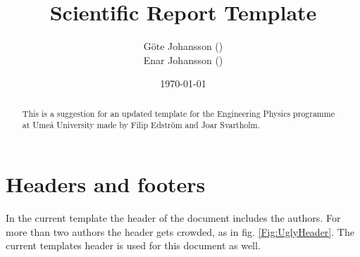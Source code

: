 
\usepackage{lipsum}
  \title{Scientific Report Template}
  \author{
    Göte Johansson () \\
    Enar Johansson ()
    }
  \date{\today}






\begin{titlepage}

  \maketitle
  \thispagestyle{FirstPageStyle}

  \begin{abstract}
   \noindent
   This is a suggestion for an updated template for the Engineering Physics programme at Umeå University made by Filip Edström and Joar Svartholm.
  \end{abstract}

\end{titlepage}


\pagestyle{DocumentStyle}
\tableofcontents
\newpage






\section{Headers and footers}
In the current template the header of the document includes the authors. For more than two authors the header gets crowded, as in fig. \ref{Fig:UglyHeader}. The current templates header is used for this document as well.

